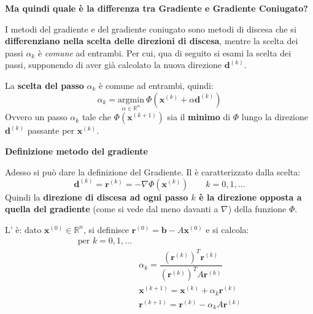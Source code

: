 \begin{flushleft}
    \textcolor{Green3}{ \textbf{Ma quindi quale è la differenza tra Gradiente e Gradiente Coniugato?}}
\end{flushleft}
I metodi del gradiente e del gradiente coniugato sono metodi di discesa che si \textbf{differenziano nella scelta delle direzioni di discesa}, mentre la scelta dei passi $\alpha_{k}$ è \emph{comune} ad entrambi. Per cui, qua di seguito si esami la scelta dei passi, supponendo di aver già calcolato la nuova direzione $\mathbf{d}^{\left(k\right)}$.

\highspace
La \textbf{scelta del passo} $\alpha_{k}$ è comune ad entrambi, quindi:
\begin{equation}
    \alpha_{k} = \underset{\alpha \in \mathbb{R}^{n}}{\mathrm{argmin}} \: \varPhi\left(\mathbf{x}^{\left(k\right)} + \alpha\mathbf{d}^{\left(k\right)}\right)
\end{equation}
Ovvero un passo $\alpha_{k}$ tale che $\varPhi\left(\mathbf{x}^{\left(k+1\right)}\right)$ sia il \textbf{minimo} di $\varPhi$ lungo la direzione $\mathbf{d}^{\left(k\right)}$ passante per $\mathbf{x}^{\left(k\right)}$.

\highspace
\begin{flushleft}
    \textcolor{Red2}{ \textbf{Definizione metodo del gradiente}}
\end{flushleft}
Adesso si può dare la definizione del Gradiente. Il  è caratterizzato dalla scelta:
\begin{equation}
    \mathbf{d}^{\left(k\right)} = \mathbf{r}^{\left(k\right)} = -\nabla\varPhi\left(\mathbf{x}^{\left(k\right)}\right) \hspace{2em} k = 0, 1, \dots
\end{equation}
Quindi la \textbf{direzione di discesa ad ogni passo $k$ è la direzione opposta a quella del gradiente} (come si vede dal meno davanti a $\nabla$) della funzione $\varPhi$.

\highspace
L' è: dato $\mathbf{x}^{\left(0\right)} \in \mathbb{R}^{n}$, si definisce $\mathbf{r}^{\left(0\right)} = \mathbf{b} - A\mathbf{x}^{\left(0\right)}$ e si calcola:
\begin{equation}
    \begin{array}{rl}
        \text{per } k = 0, 1, \dots & \\
        & \alpha_{k} = \dfrac{
            \left(\mathbf{r}^{\left(k\right)}\right)^{T} \mathbf{r}^{\left(k\right)}
        }{
            \left(\mathbf{r}^{\left(k\right)}\right)^{T} A \mathbf{r}^{\left(k\right)}
        } \\ [2em]
        & \mathbf{x}^{\left(k+1\right)} = \mathbf{x}^{\left(k\right)} + \alpha_{k}\mathbf{r}^{\left(k\right)} \\ [1em]
        & \mathbf{r}^{\left(k+1\right)} = \mathbf{r}^{\left(k\right)} - \alpha_{k} A \mathbf{r}^{\left(k\right)}
    \end{array}
\end{equation}

